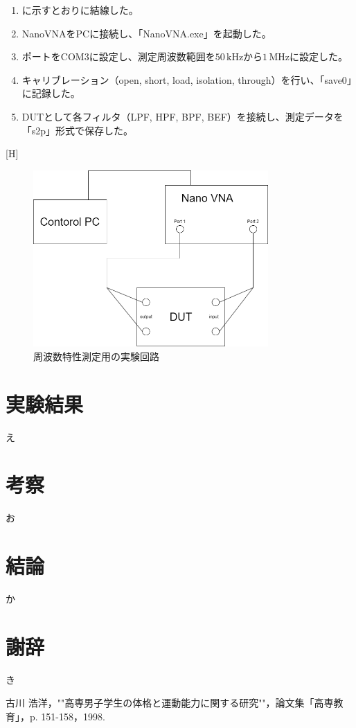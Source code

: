 \documentclass[11pt,dvipdfmx]{jarticle}
\begin{document}
\begin{enumerate}
  \item {}に示すとおりに結線した。
  \item NanoVNAをPCに接続し、「NanoVNA.exe」を起動した。
  \item ポートをCOM3に設定し、測定周波数範囲を$50\,\mathrm{kHz}$から$1\,\mathrm{MHz}$に設定した。
  \item キャリブレーション（open, short, load, isolation, through）を行い、「save0」に記録した。
  \item DUTとして各フィルタ（LPF, HPF, BPF, BEF）を接続し、測定データを「s2p」形式で保存した。
\end{enumerate}[H]
\begin{figure}
  \centering
  \includegraphics[width=0.8\textwidth]{fig/VNA.drawio.png}
  \caption{周波数特性測定用の実験回路}
  \label{fig:実験回路2}
\end{figure}

\section{実験結果}
え

\section{考察}
お

\section{結論}
か

\section{謝辞}
き


\begin{thebibliography}{99}
 古川 浩洋，""高専男子学生の体格と運動能力に関する研究""，論文集「高専教育」，p. 151-158，1998.
\end{thebibliography}
\end{document}
